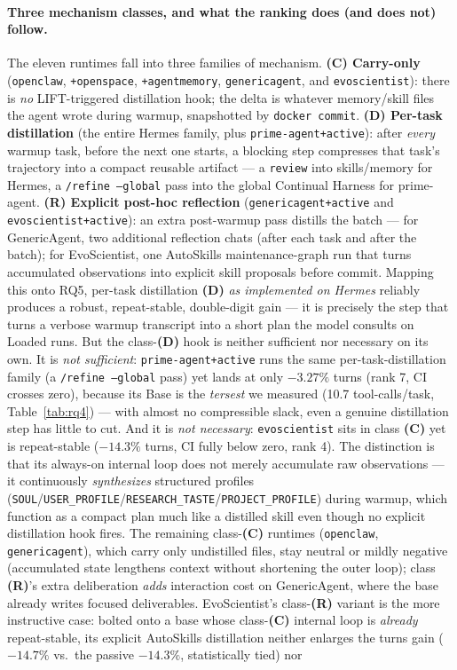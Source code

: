 \documentclass{article}
\begin{document}
\paragraph{Three mechanism classes, and what the ranking does (and does not) follow.} The eleven runtimes fall into three families of mechanism. \textbf{(C) Carry-only} (\texttt{openclaw}, \texttt{+openspace}, \texttt{+agentmemory}, \texttt{genericagent}, and \texttt{evoscientist}): there is \emph{no} LIFT-triggered distillation hook; the delta is whatever memory/skill files the agent wrote during warmup, snapshotted by \texttt{docker commit}. \textbf{(D) Per-task distillation} (the entire Hermes family, plus \texttt{prime-agent+active}): after \emph{every} warmup task, before the next one starts, a blocking step compresses that task's trajectory into a compact reusable artifact --- a \texttt{review} into skills/memory for Hermes, a \texttt{/refine --global} pass into the global Continual Harness for prime-agent. \textbf{(R) Explicit post-hoc reflection} (\texttt{genericagent+active} and \texttt{evoscientist+active}): an extra post-warmup pass distills the batch --- for GenericAgent, two additional reflection chats (after each task and after the batch); for EvoScientist, one AutoSkills maintenance-graph run that turns accumulated observations into explicit skill proposals before commit. Mapping this onto RQ5, per-task distillation \textbf{(D)} \emph{as implemented on Hermes} reliably produces a robust, repeat-stable, double-digit gain --- it is precisely the step that turns a verbose warmup transcript into a short plan the model consults on Loaded runs. But the class-\textbf{(D)} hook is neither sufficient nor necessary on its own. It is \emph{not sufficient}: \texttt{prime-agent+active} runs the same per-task-distillation family (a \texttt{/refine --global} pass) yet lands at only $-3.27\%$ turns (rank 7, CI crosses zero), because its Base is the \emph{tersest} we measured (10.7 tool-calls/task, Table~\ref{tab:rq4}) --- with almost no compressible slack, even a genuine distillation step has little to cut. And it is \emph{not necessary}: \texttt{evoscientist} sits in class \textbf{(C)} yet is repeat-stable ($-14.3\%$ turns, CI fully below zero, rank 4). The distinction is that its always-on internal loop does not merely accumulate raw observations --- it continuously \emph{synthesizes} structured profiles (\texttt{SOUL}/\texttt{USER\_PROFILE}/\texttt{RESEARCH\_TASTE}/\texttt{PROJECT\_PROFILE}) during warmup, which function as a compact plan much like a distilled skill even though no explicit distillation hook fires. The remaining class-\textbf{(C)} runtimes (\texttt{openclaw}, \texttt{genericagent}), which carry only undistilled files, stay neutral or mildly negative (accumulated state lengthens context without shortening the outer loop); class \textbf{(R)}'s extra deliberation \emph{adds} interaction cost on GenericAgent, where the base already writes focused deliverables. EvoScientist's class-\textbf{(R)} variant is the more instructive case: bolted onto a base whose class-\textbf{(C)} internal loop is \emph{already} repeat-stable, its explicit AutoSkills distillation neither enlarges the turns gain ($-14.7\%$ vs.\ the passive $-14.3\%$, statistically tied) nor 
\end{document}
